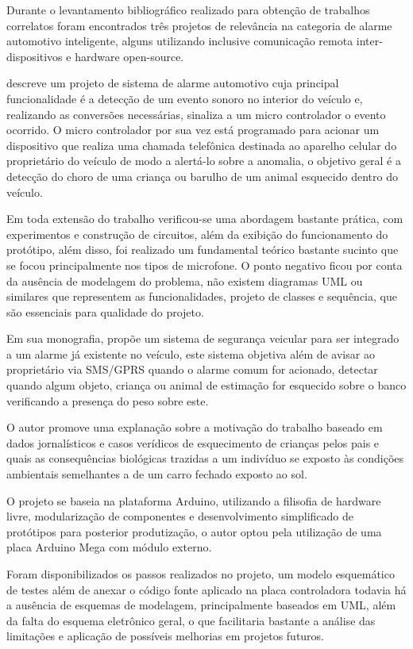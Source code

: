 Durante o levantamento bibliográfico realizado para obtenção de trabalhos correlatos foram encontrados três projetos de relevância na categoria de alarme automotivo inteligente, alguns utilizando inclusive comunicação remota inter-dispositivos e hardware open-source.

\textcite{ivan:2007} descreve um projeto de sistema de alarme automotivo 
cuja principal funcionalidade é a detecção de um evento sonoro no interior do veículo e, realizando as conversões necessárias, sinaliza a um micro controlador o evento ocorrido. O micro controlador por sua vez está programado para acionar um dispositivo que realiza uma chamada telefônica destinada ao aparelho celular do proprietário do veículo de modo a alertá-lo sobre a anomalia, o objetivo geral é a detecção do choro de uma criança ou barulho de um animal esquecido dentro do veículo. 

Em toda extensão do trabalho verificou-se uma abordagem bastante prática, com 
experimentos e construção de circuitos, além da exibição do funcionamento do 
protótipo, além disso, foi realizado um fundamental teórico bastante sucinto 
que se focou principalmente nos tipos de microfone. O ponto negativo ficou 
por conta da ausência de modelagem do problema, não existem diagramas UML ou 
similares que representem as funcionalidades, projeto de classes e sequência, 
que são essenciais para qualidade do projeto.

Em sua monografia, \textcite{leandro:2010} propõe um sistema de segurança veicular para ser integrado a um alarme já existente no veículo, este sistema objetiva além de avisar ao proprietário via SMS/GPRS quando o alarme comum for acionado, detectar quando algum objeto, criança ou animal de estimação for esquecido sobre o banco verificando a presença do peso sobre este. 

O autor promove uma explanação sobre a motivação do trabalho baseado em dados jornalísticos e casos verídicos de esquecimento de crianças pelos pais e quais as consequências biológicas trazidas a um indivíduo se exposto às condições ambientais semelhantes a de um carro fechado exposto ao sol.

O projeto se baseia na plataforma Arduino, utilizando a filisofia de hardware 
livre, modularização de componentes e desenvolvimento simplificado de protótipos 
para posterior produtização, o autor optou pela utilização de uma placa Arduino 
Mega com módulo externo. 

Foram disponibilizados os passos realizados no projeto, um modelo esquemático de testes além de anexar o código fonte aplicado na placa controladora todavia há a ausência de esquemas de modelagem, principalmente baseados em UML, além da falta do esquema eletrônico geral, o que facilitaria bastante a análise das limitações e aplicação de possíveis melhorias em projetos futuros.

